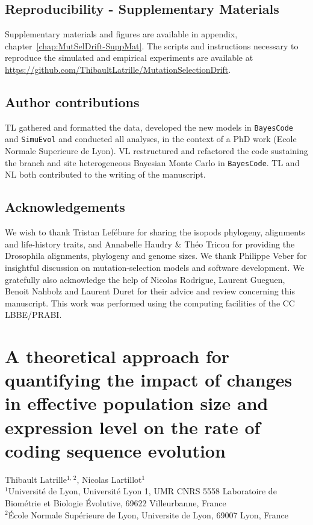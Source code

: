 \documentclass[a4paper,oneside,nobind]{thesis}
\begin{document}
    {\hypersetup{linkcolor=GREYDARK}\minitoc}

    


    \section{Reproducibility - Supplementary Materials}
    Supplementary materials and figures are available in appendix, chapter~\ref{chap:MutSelDrift-SuppMat}.
    The scripts and instructions necessary to reproduce the simulated and empirical experiments are available at \url{https://github.com/ThibaultLatrille/MutationSelectionDrift}.


    \section{Author contributions}
    TL gathered and formatted the data, developed the new models in \texttt{BayesCode} and \texttt{SimuEvol} and conducted all analyses, in the context of a PhD work (Ecole Normale Superieure de Lyon).
    VL restructured and refactored the code sustaining the branch and site heterogeneous Bayesian Monte Carlo in \texttt{BayesCode}.
    TL and NL both contributed to the writing of the manuscript.


    \section{Acknowledgements}
    We wish to thank Tristan Lefébure for sharing the isopods phylogeny, alignments and life-history traits, and Annabelle Haudry \& Théo Tricou for providing the Drosophila alignments, phylogeny and genome sizes.
    We thank Philippe Veber for insightful discussion on mutation-selection models and software development.
    We gratefully also acknowledge the help of Nicolas Rodrigue, Laurent Gueguen, Benoit Nahbolz and Laurent Duret for their advice and review concerning this manuscript.
    This work was performed using the computing facilities of the CC LBBE/PRABI.

    \thispagestyle{empty}
    \chapter{A theoretical approach for quantifying the impact of changes in effective population size and expression level on the rate of coding sequence evolution}
    \label{chap:GenoPhenoFit}

    \begin{center}
        \Large Thibault Latrille$^{\text{1, 2}}$, Nicolas Lartillot$^{\text{1}}$\\
        \vspace{0.5cm}
        \normalsize
        $^{\text{1}}$Université de Lyon, Université Lyon 1, UMR CNRS 5558 Laboratoire de Biométrie et Biologie Évolutive, 69622 Villeurbanne, France\\
        $^{\text{2}}$École Normale Supérieure de Lyon, Universite de Lyon, 69007 Lyon, France\\
    \end{center}
\end{document}
